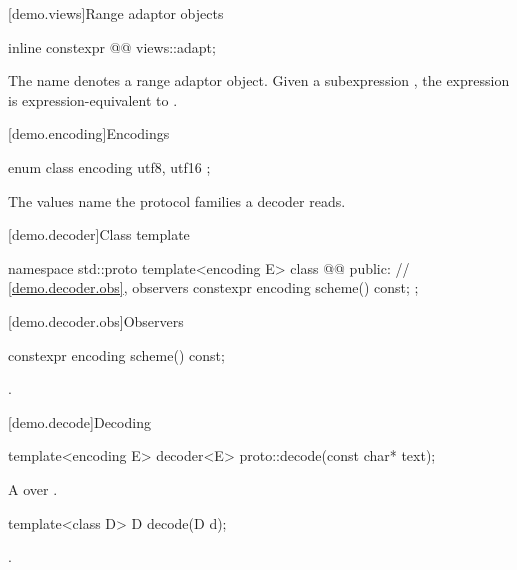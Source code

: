 [demo.views]{Range adaptor objects}

%
\begin{itemdecl}
inline constexpr @@ views::adapt;
\end{itemdecl}

\begin{itemdescr}
\pnum
\remarks
The name  denotes a range adaptor object. Given a subexpression , the expression  is expression-equivalent to .
\end{itemdescr}

[demo.encoding]{Encodings}

%
\begin{itemdecl}
enum class encoding { utf8, utf16 };
\end{itemdecl}

\begin{itemdescr}
\pnum
\remarks
The values name the protocol families a decoder reads.
\end{itemdescr}

[demo.decoder]{Class template }

\begin{codeblock}
namespace std::proto {
  template<encoding E>
  class @@ {
  public:
    // \ref{demo.decoder.obs}, observers
    constexpr encoding scheme() const;
  };
}
\end{codeblock}

[demo.decoder.obs]{Observers}

%
\begin{itemdecl}
constexpr encoding scheme() const;
\end{itemdecl}

\begin{itemdescr}
\pnum
\returns
{}.
\end{itemdescr}

[demo.decode]{Decoding}

%
\begin{itemdecl}
template<encoding E>
  decoder<E> proto::decode(const char* text);
\end{itemdecl}

\begin{itemdescr}
\pnum
\returns
A  over .
\end{itemdescr}

%
\begin{itemdecl}
template<class D>
  D decode(D d);
\end{itemdecl}

\begin{itemdescr}
\pnum
\returns
{}.
\end{itemdescr}
